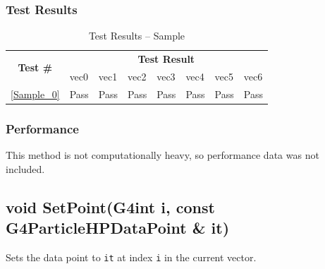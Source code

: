 \documentclass[12pt]{article}
\begin{document}
	\subsubsection{Test Results}
		\begin{table}[H]
		\centering
		\caption{Test Results -- Sample}\label{Sample_acc}
		\begin{tabular}{clllllll}
		\toprule
		\multirow{2}{*}{\bf Test \#} & \multicolumn{7}{c}{\bf Test Result}\\
		& vec0 & vec1 & vec2 & vec3 & vec4 & vec5 & vec6\\\midrule
		\ref{Sample_0} & Pass & Pass & Pass & Pass & Pass & Pass & Pass\\
		\bottomrule
		\end{tabular}
		\end{table}

	\subsubsection{Performance}
		This method is not computationally heavy, so performance data was not included.

\subsection{void SetPoint(G4int i, const G4ParticleHPDataPoint \& it)}
	
	Sets the data point to \texttt{it} at index \texttt{i} in the current vector.
\end{document}
